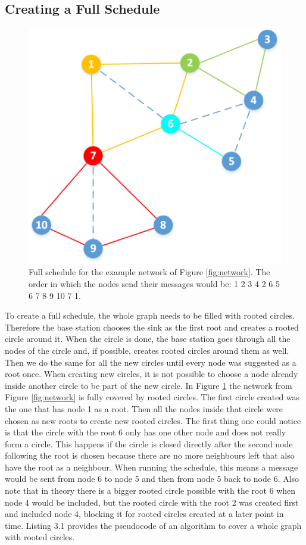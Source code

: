 \subsection{Creating a Full Schedule}
\begin{figure}[htbp]
	\centering         
    \includegraphics[scale=0.5]{content/images/Schedule/FullSchedule}
    \caption{Full schedule for the example network of Figure \ref{fig:network}. The order in which the nodes send their messages would be: 1 2 3 4 2 6 5 6 7 8 9 10 7 1.}
    \label{fig:schedule}
\end{figure} 
To create a full schedule, the whole graph needs to be filled with rooted circles. Therefore the base station chooses the sink as the first root and creates a rooted circle around it. When the circle is done, the base station goes through all the nodes of the circle and, if possible, creates rooted circles around them as well. Then we do the same for all the new circles until every node was suggested as a root once. When creating new circles, it is not possible to choose a node already inside another circle to be part of the new circle. In Figure \ref{fig:schedule} the network from Figure \ref{fig:network} is fully covered by rooted circles. The first circle created was the one that has node 1 as a root. Then all the nodes inside that circle were chosen as new roots to create new rooted circles. The first thing one could notice is that the circle with the root 6 only has one other node and does not really form a circle. This happens if the circle is closed directly after the second node following the root is chosen because there are no more neighbours left that also have the root as a neighbour. When running the schedule, this means a message would be sent from node 6 to node 5 and then from node 5 back to node 6. Also note that in theory there is a bigger rooted circle possible with the root 6 when node 4 would be included, but the rooted circle with the root 2 was created first and included node 4, blocking it for rooted circles created at a later point in time. Listing 3.1 provides the pseudocode of an algorithm to cover a whole graph with rooted circles.

